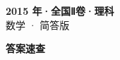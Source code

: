\documentclass[zihao=-4, a4paper]{ctexart}
\begin{document}
\begin{center}
  {\Large\bfseries 2015 年·全国Ⅱ卷·理科}\\[4pt]
  {\large 数学 · 简答版}
\end{center}
\medskip
{}

\clearpage
{}
\begin{center}{\Large\bfseries 答案速查}\end{center}
\medskip

\end{document}
